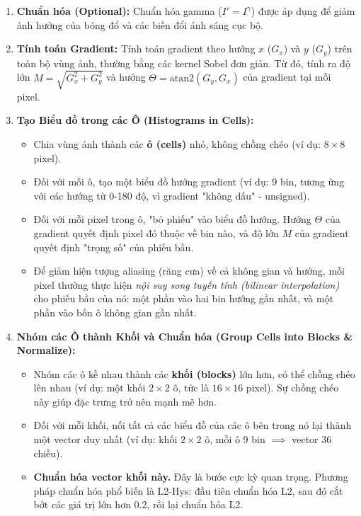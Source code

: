 \begin{enumerate}
    \item \textbf{Chuẩn hóa (Optional):} Chuẩn hóa gamma ($I' = I^\gamma$) được áp dụng để giảm ảnh hưởng của bóng đổ và các biến đổi ánh sáng cục bộ.
    
    \item \textbf{Tính toán Gradient:} Tính toán gradient theo hướng $x$ ($G_x$) và $y$ ($G_y$) trên toàn bộ vùng ảnh, thường bằng các kernel Sobel đơn giản. Từ đó, tính ra độ lớn $M = \sqrt{G_x^2 + G_y^2}$ và hướng $\Theta = \text{atan2}(G_y, G_x)$ của gradient tại mỗi pixel.
    
    \item \textbf{Tạo Biểu đồ trong các Ô (Histograms in Cells):}
    \begin{itemize}
        \item Chia vùng ảnh thành các \textbf{ô (cells)} nhỏ, không chồng chéo (ví dụ: $8 \times 8$ pixel).
        \item Đối với mỗi ô, tạo một biểu đồ hướng gradient (ví dụ: 9 bin, tương ứng với các hướng từ 0-180 độ, vì gradient "không dấu" - unsigned).
        \item Đối với mỗi pixel trong ô, "bỏ phiếu" vào biểu đồ hướng. Hướng $\Theta$ của gradient quyết định pixel đó thuộc về bin nào, và độ lớn $M$ của gradient quyết định "trọng số" của phiếu bầu.
        \item Để giảm hiện tượng aliasing (răng cưa) về cả không gian và hướng, mỗi pixel thường thực hiện \textit{nội suy song tuyến tính (bilinear interpolation)} cho phiếu bầu của nó: một phần vào hai bin hướng gần nhất, và một phần vào bốn ô không gian gần nhất.
    \end{itemize}
    
    \item \textbf{Nhóm các Ô thành Khối và Chuẩn hóa (Group Cells into Blocks \& Normalize):}
    \begin{itemize}
        \item Nhóm các ô kề nhau thành các \textbf{khối (blocks)} lớn hơn, có thể chồng chéo lên nhau (ví dụ: một khối $2 \times 2$ ô, tức là $16 \times 16$ pixel). Sự chồng chéo này giúp đặc trưng trở nên mạnh mẽ hơn.
        \item Đối với mỗi khối, nối tất cả các biểu đồ của các ô bên trong nó lại thành một vector duy nhất (ví dụ: khối $2 \times 2$ ô, mỗi ô 9 bin $\implies$ vector 36 chiều).
        \item \textbf{Chuẩn hóa vector khối này.} Đây là bước cực kỳ quan trọng. Phương pháp chuẩn hóa phổ biến là L2-Hys: đầu tiên chuẩn hóa L2, sau đó cắt bớt các giá trị lớn hơn 0.2, rồi lại chuẩn hóa L2.
    \end{itemize}
    

\end{enumerate}
